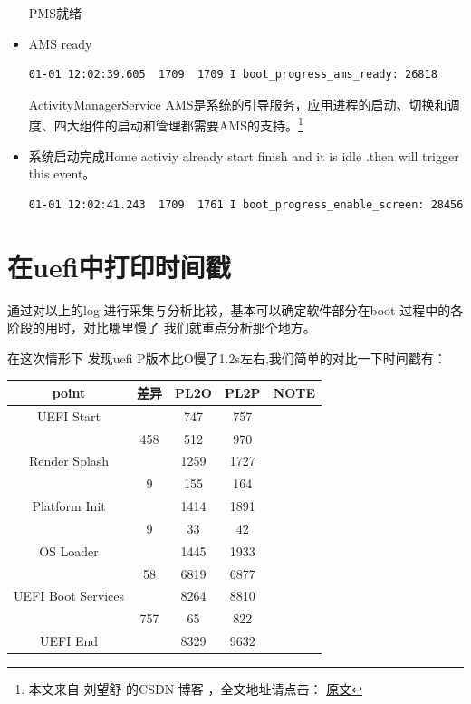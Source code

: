 \begin{itemize}
PMS就绪


\item AMS ready

\begin{lstlisting}
01-01 12:02:39.605  1709  1709 I boot_progress_ams_ready: 26818
\end{lstlisting}
ActivityManagerService AMS是系统的引导服务，应用进程的启动、切换和调度、四大组件的启动和管理都需要AMS的支持。\footnote{
本文来自 刘望舒 的CSDN 博客 ，全文地址请点击：
\href{https://blog.csdn.net/itachi85/article/details/76405596?utm_source=copy} {原文}
}





\item  系统启动完成Home activiy already start finish and it is idle .then will trigger this event。
\begin{lstlisting}
01-01 12:02:41.243  1709  1761 I boot_progress_enable_screen: 28456
\end{lstlisting}





\end{itemize}






\section{在uefi中打印时间戳}

通过对以上的log 进行采集与分析比较，基本可以确定软件部分在boot 过程中的各阶段的用时，对比哪里慢了
我们就重点分析那个地方。

在这次情形下 发现uefi  P版本比O慢了1.2s左右,我们简单的对比一下时间戳有：


\begin{table}[!ht]
\centering
\begin{tabular}{|c|c|c|c|c|}
\hline
point&差异&PL2O&PL2P&NOTE\\
\hline
UEFI Start& &747&757&\\
\hline
 &  458& 512& 970& \\
\hline
Render Splash& &1259&1727& \\ 
\hline
 &  9& 155&164& \\
\hline
Platform Init& &1414&1891& \\		
\hline
 & 9 & 33&42& \\
\hline
OS Loader& &1445 &1933&  \\
\hline
 & 58 & 6819&6877& \\
\hline
UEFI Boot Services & &8264  &8810 & \\
\hline
 & 757 & 65&822& \\
\hline
UEFI End& & 8329&9632& \\
\hline
\end{tabular}
\end{table}


